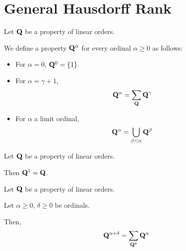 
\section{General Hausdorff Rank}

\begin{definition}
  Let $\mathbf{Q}$ be a property of linear orders.

  We define a property $\mathbf{Q}^{\alpha}$
  for every ordinal $\alpha \ge 0$ as follows:

  \begin{itemize}
    \item For $\alpha = 0$, $\mathbf{Q}^{0} = \left\{ {1} \right\}$.
    \item For $\alpha = \gamma + 1$,
          \[\mathbf{Q}^{\alpha} = \sum_{\mathbf{Q}}{\mathbf{Q}^{\gamma}}\]
    \item For $\alpha$ a limit ordinal,
          \[\mathbf{Q}^{\alpha} = \bigcup_{\beta < \alpha} \mathbf{Q}^{\beta}\]
  \end{itemize}
\end{definition}

\begin{example}
  Let $\mathbf{Q}$ be a property of linear orders.

  Then $\mathbf{Q}^{1} = \mathbf{Q}$.
\end{example}

\begin{lemma}\label{sum-of-ranks}
  Let $\mathbf{Q}$ be a property of linear orders.

  Let $\alpha \ge 0$, $\delta \ge 0$ be ordinals.

  Then,
  \[
    \mathbf{Q}^{\alpha + \delta}
    = \sum_{\mathbf{Q}^{\delta}}{\mathbf{Q}^{\alpha}}
  \]
\end{lemma}

